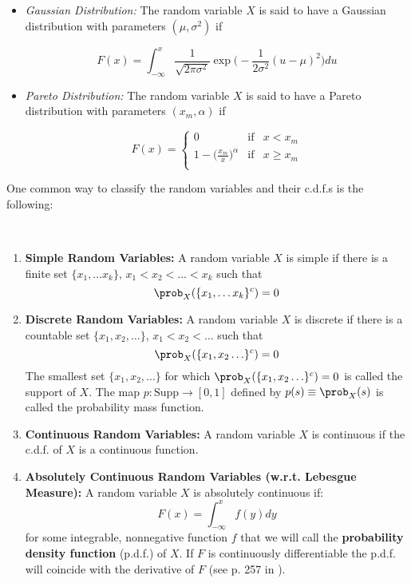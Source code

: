 \documentclass[11pt]{article} %
\begin{document}
\begin{itemize}
\item \emph{Gaussian Distribution:} The random variable $X$ is said to have a Gaussian distribution with parameters $(\mu, \sigma^2)$ if 

$$F(x) = \int_{-\infty}^{x} \frac{1}{\sqrt{2 \pi \sigma^2} } \exp\Big(-\frac{1}{2 \sigma^2} (u-\mu)^2 \Big) du $$ 

\item \emph{Pareto Distribution:} The random variable $X$ is said to have a Pareto distribution with parameters $(x_m, \alpha)$ if 

\begin{equation*}
F(x) = 
\left\{
\begin{array}{ccc}
0  & \text{if}  & x < x_m   \\
1-\Big(\frac{x_m}{x} \Big)^{\alpha} & \text{if}  & x \geq x_m   \\
\end{array}
\right.
\end{equation*}

\end{itemize}

One common way to classify the random variables and their c.d.f.s is the following:

\begin{definition}  \:\
\begin{enumerate}
\item \textbf{Simple Random Variables:} A random variable $X$ is simple if there
  is a finite set $\{x_1, \ldots x_k\}$, $x_1<x_2< \ldots < x_k$ such that 
$$\prob_{X}(\{x_1, \ldots x_k\}^c)=0$$
\item \textbf{Discrete Random Variables:} A random variable $X$ is discrete if there is a countable set $\{x_1, x_2, \ldots\}$, $x_1<x_2<\ldots$ such that 
$$\prob_{X}(\{x_1, x_2\ldots \}^c)=0$$
The smallest set $\{x_1, x_2, \ldots\}$ for which $\prob_{X}(\{x_1, x_2\ldots \}^c)=0$ is called the support of $X$. The map $p: \text{Supp} \rightarrow [0,1]$ defined by $p(s)\equiv\prob_{X}(s)$ is called the probability mass function. 
\item \textbf{Continuous Random Variables:} A random variable $X$ is continuous if the c.d.f. of $X$ is a continuous function.
\item \textbf{Absolutely Continuous Random Variables (w.r.t. Lebesgue Measure):} A random variable $X$ is absolutely continuous if:
$$F(x) = \int_{-\infty}^{x} f(y)dy $$
for some integrable, nonnegative function $f$ that we will call the \textbf{probability density function} (p.d.f.) of $X$. If $F$ is continuously differentiable the p.d.f. will coincide with the derivative of $F$ (see p. 257 in \cite{Billingsley95}).
\end{enumerate}

\end{definition}
\end{document}
